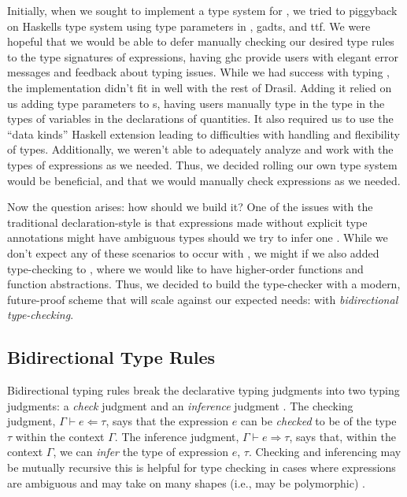 Initially, when we sought to implement a type system for \Expr{}, we tried to
piggyback on Haskells type system using type parameters in \Expr{}, \acsp{gadt},
and \acs{ttf}. We were hopeful that we would be able to defer manually checking
our desired type rules to the type signatures of expressions, having \acs{ghc}
provide users with elegant error messages and feedback about typing issues.
While we had success with typing \Expr{}, the implementation didn't fit in well
with the rest of Drasil. Adding it relied on us adding type parameters to
\QuantityDict{}s, having users manually type in the type in the types of
variables in the declarations of quantities. It also required us to use the
``data kinds'' Haskell extension \cite{GHC2020DataKinds} leading to difficulties
with handling and flexibility of types. Additionally, we weren't able to
adequately analyze and work with the types of expressions as we needed. Thus, we
decided rolling our own type system would be beneficial, and that we would
manually check expressions as we needed.

Now the question arises: how should we build it? One of the issues with the
traditional declaration-style is that expressions made without explicit type
annotations might have ambiguous types should we try to infer one
\cite{nlab:bidirectional_typechecking}. While we don't expect any of these
scenarios to occur with \Expr{}, we might if we also added type-checking to
\ModelExpr{}, where we would like to have higher-order functions and function
abstractions. Thus, we decided to build the type-checker with a modern,
future-proof scheme that will scale against our expected
needs\cite{CaretteDiscussion2022}: with \textit{bidirectional type-checking}.

\subsection{Bidirectional Type Rules}
\label{chap:typed-expr:sec:type-safe-expressions:subsec:bidirectional-type-rules}

Bidirectional typing rules break the declarative typing judgments into two
typing judgments: a \textit{check} judgment and an \textit{inference} judgment
\cite{Christiansen2013}. The checking judgment, \(\Gamma{} \vdash{} e \Leftarrow
\tau{}\), says that the expression \(e\) can be \textit{checked} to be of the
type \(\tau\) within the context \(\Gamma\). The inference judgment, \(\Gamma{}
\vdash{} e \Rightarrow \tau{}\), says that, within the context \(\Gamma\), we
can \textit{infer} the type of expression \(e\), \(\tau\). Checking and
inferencing may be mutually recursive \textemdash{} this is helpful for type
checking in cases where expressions are ambiguous and may take on many shapes
(i.e., may be polymorphic) \cite{nlab:bidirectional_typechecking}.

